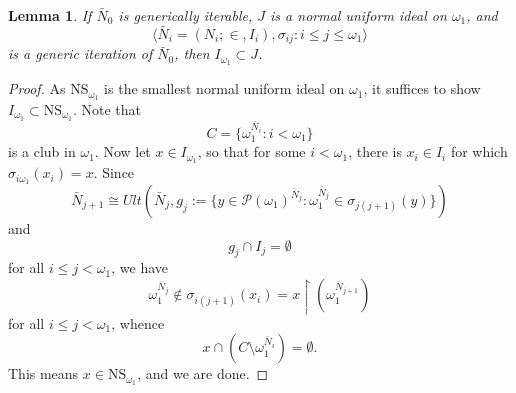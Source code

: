 \documentclass[12pt, twoside]{memoir}
\numberwithin{equation}{section}
\newtheorem{lem}[thm]{Lemma}
\theoremstyle{definition}
\theoremstyle{remark}
\theoremstyle{definition}
\theoremstyle{definition}
\theoremstyle{definition}
\theoremstyle{remark}
\begin{document}
\begin{lem}\label{gisubset}
If $\bar{N}_0$ is generically iterable, $J$ is a normal uniform ideal on $\omega_1$, and $$\langle \bar{N}_i = (N_i; \in, I_i), \sigma_{ij} : i \leq j \leq \omega_1 \rangle$$ is a generic iteration of $\bar{N}_0$, then $I_{\omega_1} \subset J$.
\end{lem}
\begin{proof}
As $\mathrm{NS}_{\omega_1}$ is the smallest normal uniform ideal on $\omega_1$, it suffices to show $I_{\omega_1} \subset \mathrm{NS}_{\omega_1}$. Note that $$C = \{\omega_1^{\bar{N}_i} : i < \omega_1\}$$ is a club in $\omega_1$. Now let $x \in I_{\omega_1}$, so that for some $i < \omega_1$, there is $x_i \in I_i$ for which $\sigma_{i\omega_1}(x_i) = x$. Since 
\begin{equation*}
    \bar{N}_{j+1} \cong Ult(\bar{N}_j, g_j := \{y \in \mathcal{P}(\omega_1)^{\bar{N}_j} : \omega_1^{\bar{N}_j} \in \sigma_{j(j+1)}(y)\})
\end{equation*}
and
\begin{equation*}
    g_j \cap I_j = \emptyset
\end{equation*}
for all $i \leq j < \omega_1$, we have 
\begin{equation*}
    \omega_1^{\bar{N}_j} \not\in \sigma_{i(j+1)}(x_i) = x \restriction (\omega_1^{\bar{N}_{j+1}}) 
\end{equation*}
for all $i \leq j < \omega_1$, whence $$x \cap (C \setminus \omega_1^{\bar{N}_i}) = \emptyset.$$ This means $x \in \mathrm{NS}_{\omega_1}$, and we are done.
\end{proof}
\end{document}
